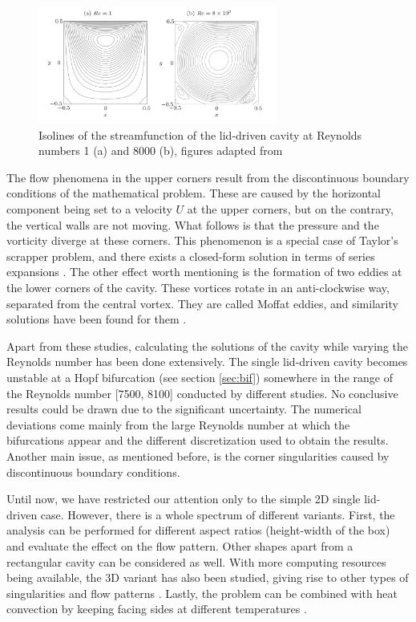 \begin{figure}[ht!]
\begin{center}
  \includegraphics[width=0.7\textwidth]{figs/fig_kuhlmann2019}
\end{center}
\caption{Isolines of the streamfunction of the lid-driven cavity at Reynolds
  numbers 1 (a) and 8000 (b), figures adapted from \cite{kuhlmann2019}}
\label{fig:Re_cav_simple}
\end{figure}

The flow phenomena in the upper corners result from the discontinuous boundary
conditions of the mathematical problem. These are caused by the horizontal
component being set to a velocity $U$ at the upper corners, but on the
contrary, the vertical walls are not moving. What follows is that the pressure
and the vorticity diverge at these corners. This phenomenon is a special case
of Taylor's scrapper problem, and there exists a closed-form solution in terms
of series expansions \citep{kuhlmann2019}. The other effect worth mentioning is
the formation of two eddies at the lower corners of the cavity. These vortices
rotate in an anti-clockwise way, separated from the central vortex. They are
called Moffat eddies, and similarity solutions have been found for them
\citep{moffatt1964}.

Apart from these studies, calculating the solutions of the cavity while varying
the Reynolds number has been done extensively. The single lid-driven cavity
becomes unstable at a Hopf bifurcation (see section \ref{sec:bif}) somewhere in
the range of the Reynolds number [7500, 8100] \citep{kuhlmann2019} conducted by
different studies. No conclusive results could be drawn due to the significant
uncertainty. The numerical deviations come mainly from the large Reynolds
number at which the bifurcations appear and the different discretization used
to obtain the results. Another main issue, as mentioned before, is the corner
singularities caused by discontinuous boundary conditions.

Until now, we have restricted our attention only to the simple 2D single
lid-driven case. However, there is a whole spectrum of different variants.
First, the analysis can be performed for different aspect ratios (height-width
of the box) and evaluate the effect on the flow pattern. Other shapes apart
from a rectangular cavity can be considered as well. With more computing
resources being available, the 3D variant has also been studied, giving rise to
other types of singularities and flow patterns \citep{lopez2017}. Lastly, the
problem can be combined with heat convection by keeping facing sides at
different temperatures \citep{koseff1985}. \\


